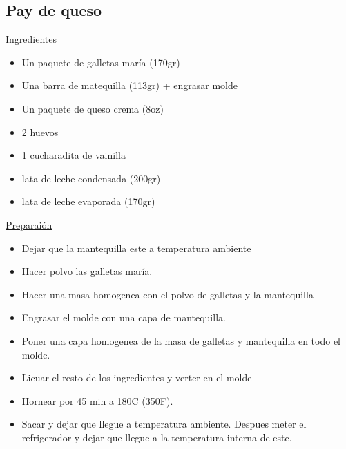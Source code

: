 \subsection{Pay de queso}
\underline{Ingredientes}
\begin{itemize}
\item Un paquete de galletas mar\'ia (170gr)
\item Una barra de matequilla (113gr) + engrasar molde
\item Un paquete de queso crema (8oz)
\item 2 huevos
\item 1 cucharadita de vainilla
\item {} lata de leche condensada (200gr)
\item {} lata de leche evaporada (170gr)
\end{itemize}

\underline{Preparai\'on}
\begin{itemize}
\item Dejar que la mantequilla este a temperatura ambiente
\item Hacer polvo las galletas mar\'ia.
\item Hacer una masa homogenea con el polvo de galletas y la mantequilla
\item Engrasar el molde con una capa de mantequilla.
\item Poner una capa homogenea de la masa de galletas y mantequilla en todo el molde.
\item Licuar el resto de los ingredientes y verter en el molde
\item Hornear por 45 min a 180C (350F).
\item Sacar y dejar que llegue a temperatura ambiente. Despues meter el refrigerador y dejar que llegue a la temperatura interna de este. 
\end{itemize}
